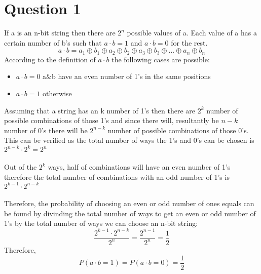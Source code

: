 \documentclass{article}
\begin{document}
    \section*{Question 1}
    If a is an n-bit string then there are $2^n$ possible values of a. Each value of a has
    a certain number of b's such that $a\cdot b = 1$ and $a\cdot b = 0$ for the rest.
    $$a\cdot b = a_1\oplus b_1 \oplus a_2\oplus b_2 \oplus a_3\oplus b_3 \oplus...\oplus a_n\oplus b_n$$
    According to the definition of $a\cdot b$ the following cases are possible:
    \begin{itemize}
        \item $a \cdot b = 0$ a$\&$b have an even number of 1's in the same positions
        \item $a \cdot b = 1$ otherwise
    \end{itemize}
    Assuming that a string has an k number of 1's then there are $2^k$ number of possible combinations of those 1's
    and since there will, resultantly be $n-k$ number of 0's there will be $2^{n-k}$ number of possible combinations 
    of those 0's. This can be verified as the total number of ways the 1's and 0's can be chosen is $2^{n-k}\cdot 2^k = 2^n$\\\\
    Out of the $2^k$ ways, half of combinations will have an even number of 1's therefore the total number of combinations with an odd 
    number of 1's is $2^{k-1}\cdot 2^{n-k}$\\\\
    Therefore, the probability of choosing an even or odd number of ones equals can be found by 
    divinding the total number of ways to get an even or odd number of 1's by the total number of ways we can choose
    an n-bit string: $$\frac{2^{k-1}\cdot 2^{n-k}}{2^n} = \frac{2^{n-1}}{2^n} = \frac{1}{2}$$
    Therefore, $$P(a\cdot b = 1) = P(a\cdot b = 0) = \frac{1}{2}$$
\end{document}
